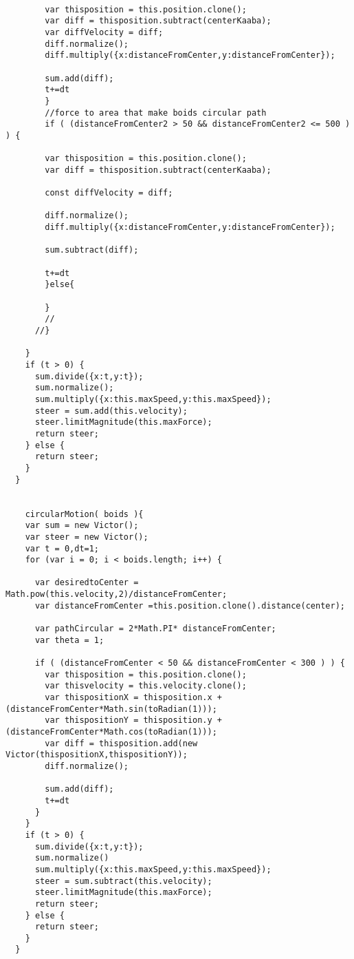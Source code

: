 \begin{lstlisting}
      
        var thisposition = this.position.clone();
        var diff = thisposition.subtract(centerKaaba);
        var diffVelocity = diff;
        diff.normalize();
        diff.multiply({x:distanceFromCenter,y:distanceFromCenter});
    
        sum.add(diff);
        t+=dt
        }
        //force to area that make boids circular path 
        if ( (distanceFromCenter2 > 50 && distanceFromCenter2 <= 500 ) ) {

        var thisposition = this.position.clone();
        var diff = thisposition.subtract(centerKaaba);
 
        const diffVelocity = diff;

        diff.normalize();
        diff.multiply({x:distanceFromCenter,y:distanceFromCenter});

        sum.subtract(diff);

        t+=dt
        }else{

        }
        // 
      //}
      
    }
    if (t > 0) {
      sum.divide({x:t,y:t});
      sum.normalize();
      sum.multiply({x:this.maxSpeed,y:this.maxSpeed});
      steer = sum.add(this.velocity);
      steer.limitMagnitude(this.maxForce);
      return steer;
    } else {
      return steer;
    }
  }


    circularMotion( boids ){
    var sum = new Victor();
    var steer = new Victor();
    var t = 0,dt=1;
    for (var i = 0; i < boids.length; i++) {

      var desiredtoCenter = Math.pow(this.velocity,2)/distanceFromCenter;
      var distanceFromCenter =this.position.clone().distance(center);

      var pathCircular = 2*Math.PI* distanceFromCenter;
      var theta = 1;
      
      if ( (distanceFromCenter < 50 && distanceFromCenter < 300 ) ) {
        var thisposition = this.position.clone();
        var thisvelocity = this.velocity.clone();
        var thispositionX = thisposition.x + (distanceFromCenter*Math.sin(toRadian(1)));
        var thispositionY = thisposition.y + (distanceFromCenter*Math.cos(toRadian(1)));
        var diff = thisposition.add(new Victor(thispositionX,thispositionY));
        diff.normalize();

        sum.add(diff);
        t+=dt
      }
    }
    if (t > 0) {
      sum.divide({x:t,y:t});
      sum.normalize()
      sum.multiply({x:this.maxSpeed,y:this.maxSpeed});
      steer = sum.subtract(this.velocity);
      steer.limitMagnitude(this.maxForce);
      return steer;
    } else {
      return steer;
    }
  }



\end{lstlisting}
